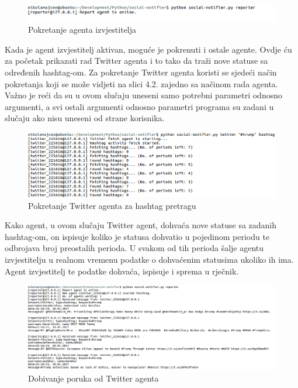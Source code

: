 \documentclass[a4paper,12pt]{foi}
\begin{document}
\begin{figure}[h]
\centering
\includegraphics[width=\linewidth, frame]{01-starting-reporter}
	\caption{Pokretanje agenta izvjestitelja}
\end{figure}

Kada je agent izvjestitelj aktivan, moguće je pokrenuti i ostale agente. Ovdje ću za početak prikazati rad Twitter agenta i to tako da traži nove statuse sa određenih hashtag-om. Za pokretanje Twitter agenta koristi se sjedeći način pokretanja koji se može vidjeti na slici 4.2. zajedno sa načinom rada agenta. Važno je reći da su u ovom slučaju uneseni samo potrebni parametri odnosno argumenti, a svi ostali argumenti odnosno parametri programa su zadani u slučaju ako nisu uneseni od strane korisnika.

\begin{figure}[h]
\includegraphics[width=\linewidth, frame]{02-starting-twitter-hashtag}
		\caption{Pokretanje Twitter agenta za hashtag pretragu}
\end{figure}

Kako agent, u ovom slučaju Twitter agent, dohvaća nove statuse sa zadanih hashtag-om, on ispisuje koliko je statusa dohvatio u pojedinom periodu te odbrojava broj preostalih perioda. U svakom od tih perioda šalje agentu izvjestitelju u realnom vremenu podatke o dohvaćenim statusima ukoliko ih ima. Agent izvjestitelj te podatke dohvaća, ispisuje i sprema u rječnik.

\begin{figure}[h]
\includegraphics[width=\linewidth, frame]{03-getting-messages-from-twitter-agent}
	\caption{Dobivanje poruka od Twitter agenta}
\end{figure}
\end{document}
